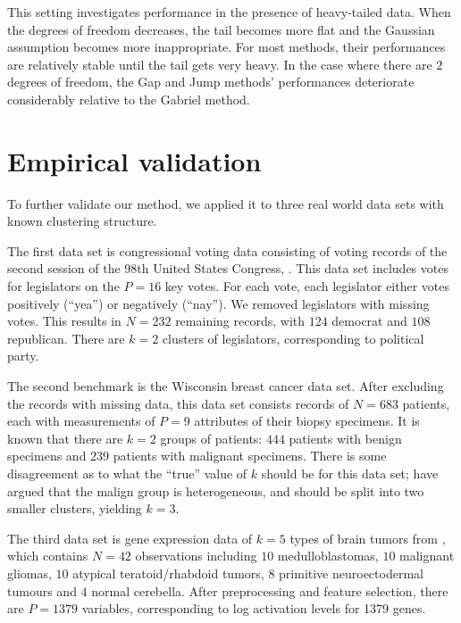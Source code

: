 \documentclass[12pt]{article}
\begin{document}
This setting investigates performance in the presence of heavy-tailed data.
When the degrees of freedom decreases, the tail becomes more flat and the
Gaussian assumption becomes more inappropriate.  For most methods, their
performances are relatively stable until the tail gets very heavy. In the case
where there are $2$ degrees of freedom, the Gap and Jump methods' performances
deteriorate considerably relative to the Gabriel method.


\section{Empirical validation}
\label{sec:empirical-validation}

To further validate our method, we applied it to three real world data sets
with known clustering structure.


The first data set is congressional voting data consisting of voting records
of the second session of the $98$th United States Congress,
\citep{schlimmer1987concept}.  This data set includes votes for legislators on
the $P = 16$ key votes.  For each vote, each legislator either votes
positively (``yea'') or negatively (``nay''). We removed legislators with missing
votes.  This results in $N = 232$ remaining records, with $124$ democrat and
$108$ republican. There are $k = 2$ clusters of legislators, corresponding to
political party.


The second benchmark is the \citet{mangasarian1990pattern} Wisconsin breast
cancer data set.  After excluding the records with missing data, this data set
consists records of $N = 683$ patients, each with measurements of $P = 9$
attributes of their biopsy specimens. It is known that there are $k = 2$
groups of patients: $444$ patients with benign specimens and $239$ patients
with malignant specimens. There is some disagreement as to what the ``true''
value of $k$ should be for this data set; \citet{fujita2014non} have argued
that the malign group is heterogeneous, and should be split into two smaller
clusters, yielding $k = 3$.


The third data set is gene expression data of $k = 5$ types of brain tumors
from \citet{pomeroy2002prediction}, which contains $N = 42$ observations
including $10$ medulloblastomas, $10$ malignant gliomas, $10$ atypical
teratoid/rhabdoid tumors, $8$ primitive neuroectodermal tumours and $4$ normal
cerebella. After preprocessing and feature selection, there are $P = 1379$
variables, corresponding to log activation levels for 1379 genes.
\end{document}
